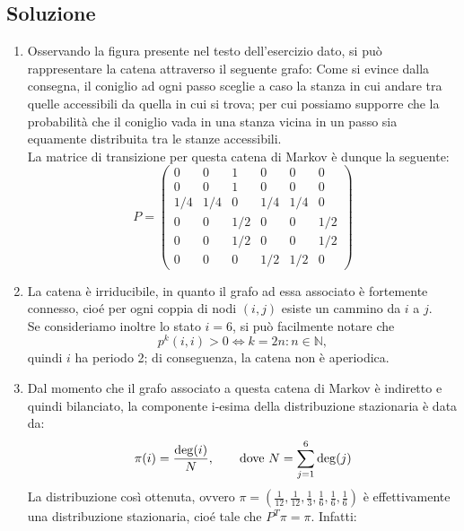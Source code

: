 \documentclass[
	12pt, %
]{fphw}
\begin{document}
\subsection*{Soluzione}
	\begin{enumerate}
	\item Osservando la figura presente nel testo dell'esercizio dato, si può rappresentare la catena attraverso il seguente grafo:
	Come si evince dalla consegna, il coniglio ad ogni passo sceglie a caso la stanza in cui andare tra quelle accessibili da quella in cui si trova; per cui possiamo supporre che la probabilità che il coniglio vada in una stanza vicina in un passo sia equamente distribuita tra le stanze accessibili.\\
	La matrice di transizione per questa catena di Markov è dunque la seguente:
	\begin{equation*}
		P = 
		\begin{pmatrix}
			0 & 0 & 1 & 0 & 0 & 0\\
			0 & 0 & 1 & 0 & 0 & 0\\
			1/4 & 1/4 & 0 & 1/4 & 1/4 & 0\\
			0 & 0 & 1/2 & 0 & 0 & 1/2\\
			0 & 0 & 1/2 & 0 & 0 & 1/2\\
			0 & 0 & 0 & 1/2 & 1/2 & 0
		\end{pmatrix}
	\end{equation*}
	\item La catena è irriducibile, in quanto il grafo ad essa associato è fortemente connesso, cioé 
	per ogni coppia di nodi $(i,j)$ esiste un cammino da $i$ a $j$.\\
	Se consideriamo inoltre lo stato $i = 6$, si può facilmente notare che
	\begin{equation*}
		p^{k}(i,i) > 0 \iff k = 2n : n \in \mathbb{N},
	\end{equation*}
	quindi $i$ ha periodo 2; di conseguenza, la catena non è aperiodica.
	\item Dal momento che il grafo associato a questa catena di Markov è indiretto e quindi bilanciato, la componente i-esima della distribuzione stazionaria è data da:
	\begin{equation*}
		\pi(i) = \frac{\deg(i)}{N}, \qquad\textnormal{dove }N = \sum_{j=1}^6 \deg(j)
	\end{equation*}
	La distribuzione così ottenuta, ovvero $\pi = (\frac{1}{12}, \frac{1}{12}, \frac{1}{3}, \frac{1}{6}, \frac{1}{6}, \frac{1}{6})$ è effettivamente una distribuzione stazionaria, cioé tale che $P^T \pi = \pi$. Infatti:

\end{enumerate}
\end{document}
